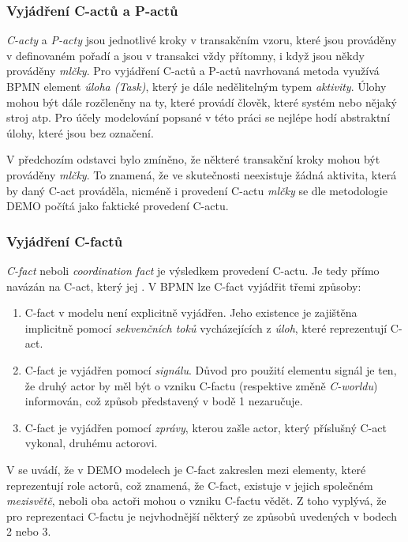 \subsubsection{Vyjádření C-actů a P-actů}
\textit{C-acty} a \textit{P-acty} jsou jednotlivé kroky v transakčním vzoru, které jsou prováděny v definovaném pořadí a jsou v transakci vždy přítomny, i když jsou někdy prováděny \textit{mlčky}. Pro vyjádření C-actů a P-actů navrhovaná metoda využívá BPMN element \textit{úloha (Task)}, který je dále nedělitelným typem \textit{aktivity}. Úlohy mohou být dále rozčleněny na ty, které provádí člověk, které systém nebo nějaký stroj atp. Pro účely modelování popsané v této práci se nejlépe hodí abstraktní úlohy, které jsou bez označení. 

V předchozím odstavci bylo zmíněno, že některé transakční kroky mohou být prováděny \textit{mlčky}. To znamená, že ve skutečnosti neexistuje žádná aktivita, která by daný C-act prováděla, nicméně i provedení C-actu \textit{mlčky} se dle metodologie DEMO počítá jako faktické provedení C-actu. \cite{Dietz2006}

\subsubsection{Vyjádření C-factů} \label{sec:vyjadreni_cfactu}
\textit{C-fact} neboli \textit{coordination fact} je výsledkem provedení C-actu. Je tedy přímo navázán na C-act, který jej . V BPMN lze C-fact vyjádřit třemi způsoby:

\begin{enumerate}
\item C-fact v modelu není explicitně vyjádřen. Jeho existence je zajištěna implicitně pomocí \textit{sekvenčních toků} vycházejících z \textit{úloh}, které reprezentují C-act.
\item C-fact je vyjádřen pomocí \textit{signálu}. Důvod pro použití elementu signál je ten, že druhý actor by měl být o vzniku C-factu (respektive změně \textit{C-worldu}) informován, což způsob představený v bodě 1 nezaručuje.
\item C-fact je vyjádřen pomocí \textit{zprávy}, kterou zašle actor, který příslušný C-act vykonal, druhému actorovi.
\end{enumerate}

V \cite{Dietz2006} se uvádí, že v DEMO modelech je C-fact zakreslen mezi elementy, které reprezentují role actorů, což znamená, že C-fact, existuje v jejich společném \textit{mezisvětě}, neboli oba actoři mohou o vzniku C-factu vědět. Z toho vyplývá, že pro reprezentaci C-factu je nejvhodnější některý ze způsobů uvedených v bodech 2 nebo 3.

